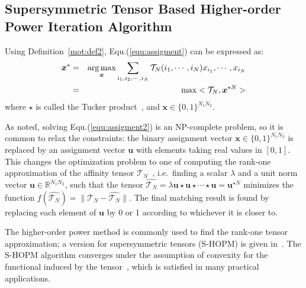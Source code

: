 \subsection{Supersymmetric Tensor Based Higher-order Power Iteration Algorithm}
\label{subsec:oursymmhopm}

Using Definition~\ref{mot:def2}, Equ.(\ref{equ:assigment}) can be expressed as:
\begin{eqnarray}
\label{equ:assigment2}
{\boldsymbol{x}}^* &=& \operatorname*{arg\,max}_{\boldsymbol{x}} \sum_{i_1,i_2,\cdots,i_N} \mathcal{T}_N(i_1,\cdots,i_N) x_{i_1},\cdots,x_{i_N} \nonumber\\
&=& \max <\mathcal{T}_N, \boldsymbol{x}^{\star N}>
\end{eqnarray}
where $\star$ is called the Tucker product~\cite{Kofidis02}, and $\boldsymbol{x} \in \{0,1\}^{N_1N_2}$.

As noted, solving Equ.(\ref{equ:assigment2}) is an NP-complete problem,
so it is common to relax the constraints:
the binary assignment vector $\boldsymbol{x}\in \{0,1\}^{N_1N_2}$ is replaced by an assignment vector $\boldsymbol{u}$ with elements taking real values in $[0,1]$.
This changes the optimization problem to one of computing the rank-one approximation of the affinity tensor $\mathcal{T}_N$~\cite{Lathauwer00},
i.e.\ finding a scalar $\lambda$ and a unit norm vector $\boldsymbol{u}\in \mathbb{R}^{N_1N_2}$,
such that the tensor $\hat{\mathcal{T}_N} = \lambda \boldsymbol{u}\star \boldsymbol{u} \star\cdots \star \boldsymbol{u}=\boldsymbol{u}^{\star N}$ minimizes the function $f(\hat{\mathcal{T}_N})=\lVert \mathcal{T}_N-\hat{\mathcal{T}_N} \lVert$.
The final matching result is found by replacing each element of $\boldsymbol{u}$ by 0 or 1 according to whichever it is closer to.

The higher-order power method is commonly used to find the rank-one tensor approximation;
a version for supersymmetric tensors (S-HOPM) is given in~\cite{Kofidis02}.
The S-HOPM algorithm converges under the assumption of convexity for the functional induced by the tensor~\cite{Kofidis02},
which is satisfied in many practical applications.

